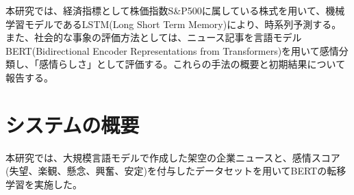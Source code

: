 \documentclass[a4paper, 10pt]{article}
\begin{document}
本研究では、経済指標として株価指数S\&P500に属している株式を用いて、機械学習モデルであるLSTM(Long Short Term Memory)により、時系列予測する。また、社会的な事象の評価方法としては、ニュース記事を言語モデルBERT(Bidirectional Encoder Representations from Transformers)を用いて感情分類し、「感情らしさ」として評価する。これらの手法の概要と初期結果について報告する。



\section{システムの概要}





本研究では、大規模言語モデルで作成した架空の企業ニュースと、感情スコア(失望、楽観、懸念、興奮、安定)を付与したデータセットを用いてBERTの転移学習を実施した。


\end{document}
